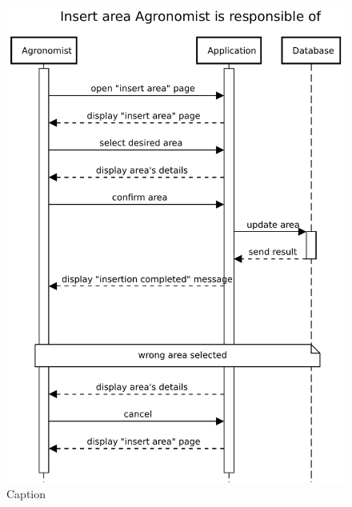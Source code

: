 \begin{figure}[H]
    \centering
    \includegraphics[scale=0.75]{Images/Sequence diagrams/Agronomist - Insert area.pdf}
    \caption{Caption}
    \label{fig:my_label}
\end{figure}


